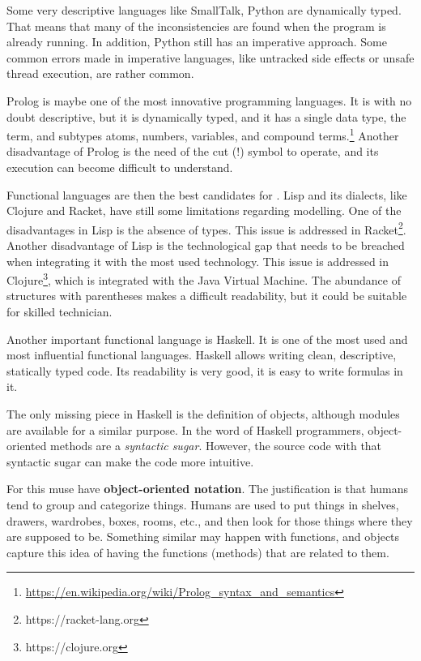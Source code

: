 Some very descriptive languages like SmallTalk, Python are dynamically typed.
That means that many of the inconsistencies are found when the program is already running.
In addition, Python still has an imperative approach.
Some common errors made in imperative languages, like untracked side effects or unsafe thread execution, are rather common.

Prolog is maybe one of the most innovative programming languages.
It is with no doubt descriptive, but it is dynamically typed, and it has a single data type, the term, and subtypes atoms, numbers, variables, and compound terms.\footnote{\url{https://en.wikipedia.org/wiki/Prolog_syntax_and_semantics}}
Another disadvantage of Prolog is the need of the cut (!) symbol to operate, and its execution can become difficult to understand.

Functional languages are then the best candidates for \Soda.
Lisp and its dialects, like Clojure and Racket, have still some limitations regarding modelling.
One of the disadvantages in Lisp is the absence of types.
This issue is addressed in Racket\footnote{https://racket-lang.org}.
Another disadvantage of Lisp is the technological gap that needs to be breached when integrating it with the most used technology.
This issue is addressed in Clojure\footnote{https://clojure.org}, which is integrated with the Java Virtual Machine.
The abundance of structures with parentheses makes a difficult readability, but it could be suitable for skilled technician.

Another important functional language is Haskell.
It is one of the most used and most influential functional languages.
Haskell allows writing clean, descriptive, statically typed code.
Its readability is very good, it is easy to write formulas in it.

The only missing piece in Haskell is the definition of objects, although modules are available for a similar purpose.
In the word of Haskell programmers, object-oriented methods are a \textit{syntactic sugar}.
However, the source code with that syntactic sugar can make the code more intuitive.

For this \Soda muse have \textbf{object-oriented notation}.
The justification is that humans tend to group and categorize things.
Humans are used to put things in shelves, drawers, wardrobes, boxes, rooms, etc., and then look for those things where they are supposed to be.
Something similar may happen with functions, and objects capture this idea of having the functions (methods) that are related to them.


